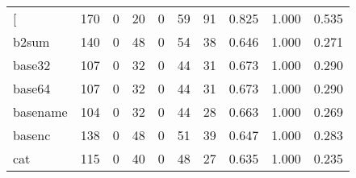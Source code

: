 \begin{longtable}{lp{1.3cm}p{1.3cm}p{1.3cm}p{1.3cm}p{1.3cm}p{1.3cm}p{1.3cm}p{1.3cm}p{1.3cm}}
\bottomrule
\endlastfoot
{[}         &                    170 &                                  0 &                                20 &                                0 &                                59 &                              91 &                                0.825 &                                  1.000 &                                0.535 \\
b2sum     &                    140 &                                  0 &                                48 &                                0 &                                54 &                              38 &                                0.646 &                                  1.000 &                                0.271 \\
base32    &                    107 &                                  0 &                                32 &                                0 &                                44 &                              31 &                                0.673 &                                  1.000 &                                0.290 \\
base64    &                    107 &                                  0 &                                32 &                                0 &                                44 &                              31 &                                0.673 &                                  1.000 &                                0.290 \\
basename  &                    104 &                                  0 &                                32 &                                0 &                                44 &                              28 &                                0.663 &                                  1.000 &                                0.269 \\
basenc    &                    138 &                                  0 &                                48 &                                0 &                                51 &                              39 &                                0.647 &                                  1.000 &                                0.283 \\
cat       &                    115 &                                  0 &                                40 &                                0 &                                48 &                              27 &                                0.635 &                                  1.000 &                                0.235 \\

\end{longtable}
